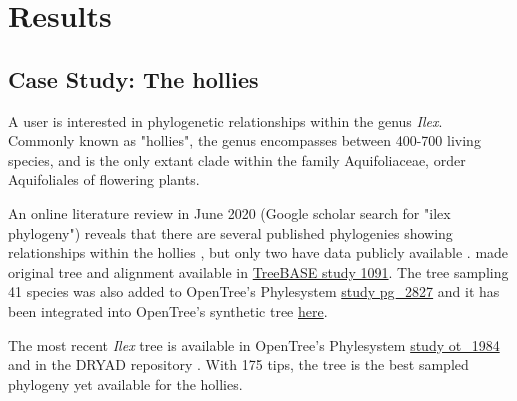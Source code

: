 \documentclass{bmcart}
\begin{document}
\section*{Results}
\subsection*{Case Study: The hollies}

A user is interested in phylogenetic relationships within the genus \textit{Ilex}. Commonly
known as "hollies", the genus encompasses between 400-700 living species, and is
the only extant clade within the family Aquifoliaceae, order Aquifoliales of flowering
plants.

An online literature review in June 2020 (Google scholar search for "ilex phylogeny")
reveals that there are several published phylogenies showing relationships within
the hollies \cite{cuenoud2000molecular, manen2010history, setoguchi2000intersectional,
selbach2009new}, but only two have data publicly available \cite{gottlieb2005molecular, yao2020phylogeny}.
\cite{gottlieb2005molecular} made original tree and alignment available in
\href{https://treebase.org/treebase-web/search/study/summary.html?id=1091}{TreeBASE study 1091}.
The tree sampling 41 species was also added to
OpenTree's Phylesystem \href{https://tree.opentreeoflife.org/curator/study/edit/pg_2827/?tab=home}{study pg\_2827}
and it has been integrated into OpenTree's synthetic tree
\href{https://devtree.opentreeoflife.org/opentree/opentree12.3@mrcaott68451ott89474/Ilex-theizans--Ilex-dumosa}{here}.

The most recent \textit{Ilex} tree \cite{yao2020phylogeny} is available in
OpenTree's Phylesystem \href{https://tree.opentreeoflife.org/curator/study/view/ot_1984}{study ot\_1984}
and in the DRYAD repository \cite{yao2020dryad}.
With 175 tips, the \cite{yao2020phylogeny} tree is the best sampled phylogeny yet available for
the hollies.
\end{document}

